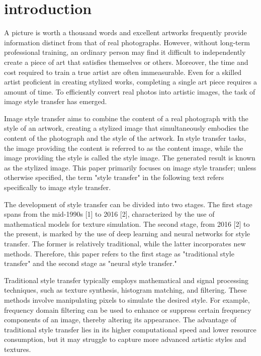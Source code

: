 \section{introduction}

A picture is worth a thousand words and excellent artworks frequently provide information distinct from that of real photographs. However, without long-term professional training, an ordinary person may find it difficult to independently create a piece of art that satisfies themselves or others. Moreover, the time and cost required to train a true artist are often immeasurable. Even for a skilled artist proficient in creating stylized works, completing a single art piece requires a amount of time. To efficiently convert real photos into artistic images, the task of image style transfer has emerged.

Image style transfer aims to combine the content of a real photograph with the style of an artwork, creating a stylized image that simultaneously embodies the content of the photograph and the style of the artwork. In style transfer tasks, the image providing the content is referred to as the content image, while the image providing the style is called the style image. The generated result is known as the stylized image. This paper primarily focuses on image style transfer; unless otherwise specified, the term "style transfer" in the following text refers specifically to image style transfer.

The development of style transfer can be divided into two stages. The first stage spans from the mid-1990s [1] to 2016 [2], characterized by the use of mathematical models for texture simulation. The second stage, from 2016 [2] to the present, is marked by the use of deep learning and neural networks for style transfer. The former is relatively traditional, while the latter incorporates new methods. Therefore, this paper refers to the first stage as "traditional style transfer" and the second stage as "neural style transfer."

Traditional style transfer typically employs mathematical and signal processing techniques, such as texture synthesis, histogram matching, and filtering. These methods involve manipulating pixels to simulate the desired style. For example, frequency domain filtering can be used to enhance or suppress certain frequency components of an image, thereby altering its appearance. The advantage of traditional style transfer lies in its higher computational speed and lower resource consumption, but it may struggle to capture more advanced artistic styles and textures.

